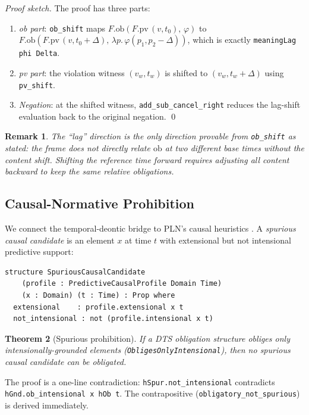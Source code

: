 \documentclass[]{article}
\newtheorem{theorem}{Theorem}
\newtheorem{remark}[theorem]{Remark}
\newcommand{\code}[1]{\texttt{#1}}
\newcommand{\DTS}{\textup{DTS}}
\newcommand{\PLN}{\textup{PLN}}
\begin{document}
\noindent
\emph{Proof sketch.}
The proof has three parts:
\begin{enumerate}
\item \emph{ob part}: \code{ob\_shift} maps
      $F.\text{ob}(F.\text{pv}\,(v, t_0),\, \varphi)$ to
      $F.\text{ob}(F.\text{pv}\,(v, t_0+\Delta),\, \lambda p.\,\varphi(p_1, p_2{-}\Delta))$,
      which is exactly \code{meaningLag phi Delta}.
\item \emph{pv part}: the violation witness $(v_w, t_w)$ is
      shifted to $(v_w, t_w + \Delta)$ using \code{pv\_shift}.
\item \emph{Negation}: at the shifted witness, \code{add\_sub\_cancel\_right}
      reduces the lag-shift evaluation back to the original negation. \qed
\end{enumerate}

\begin{remark}
The ``lag'' direction is the only direction provable from \code{ob\_shift} as
stated: the frame does not directly relate $\text{ob}$ at two different base
times without the content shift.  Shifting the reference time forward requires
adjusting all content backward to keep the same relative obligations.
\end{remark}

\subsection{Causal-Normative Prohibition}

We connect the temporal-deontic bridge to \PLN{}'s causal heuristics
\cite{GoertzelPLN2008}.
A \emph{spurious causal candidate} is an element $x$ at time $t$ with
extensional but not intensional predictive support:

\begin{lstlisting}
structure SpuriousCausalCandidate
    (profile : PredictiveCausalProfile Domain Time)
    (x : Domain) (t : Time) : Prop where
  extensional    : profile.extensional x t
  not_intensional : not (profile.intensional x t)
\end{lstlisting}

\begin{theorem}[Spurious prohibition]
If a \DTS{} obligation structure obliges only intensionally-grounded elements
(\code{ObligesOnlyIntensional}), then no spurious causal candidate can be
obligated.
\end{theorem}

\noindent
The proof is a one-line contradiction: \code{hSpur.not\_intensional}
contradicts \code{hGnd.ob\_intensional x hOb t}.
The contrapositive (\code{obligatory\_not\_spurious}) is derived immediately.
\end{document}
